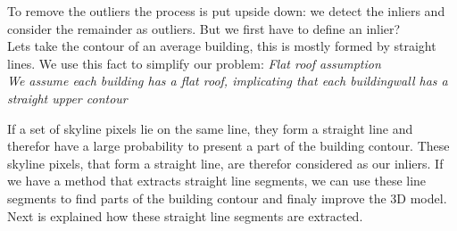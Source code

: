 \documentclass[10pt]{article}
\begin{document}

	To remove the outliers the process is put upside down: we detect the
	inliers and consider the remainder as outliers. But we first have to define an inlier?\\

	Lets take the contour of an average building, this is mostly formed by
	straight lines. We use this fact to simplify our problem: 
	\emph{Flat roof assumption}\\
	\emph{We assume each building has a flat roof, implicating that each buildingwall
	has a straight upper contour}

	If a set of skyline pixels lie on the same line, they form a straight line
	and therefor have a large probability to present a part of the building contour.
	These skyline pixels, that form a straight line, are therefor considered as our
	inliers. 
	If we have a method that extracts straight line segments, we can use these
	line segments to find parts of the building contour and finaly improve the 3D
	model. Next is explained how these straight line segments are extracted.
\end{document}
